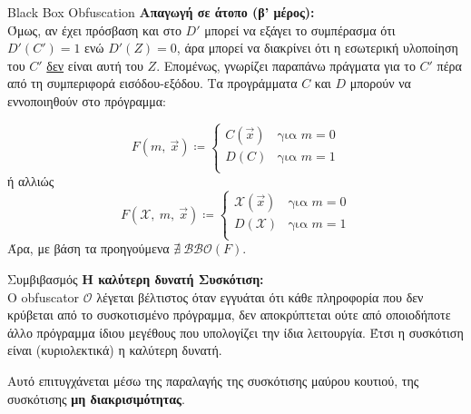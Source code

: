 \documentclass[xcolor=dvipsnames]{beamer}
\newcommand{\lt}{\latintext}
\begin{document}
\begin{frame}{\lt Black Box Obfuscation}
\textbf{Απαγωγή σε άτοπο (β' μέρος):}\\
Όμως, αν έχει πρόσβαση και στο $D'$ μπορεί να εξάγει το συμπέρασμα ότι $D'(C') = 1$ ενώ $D'(Z) = 0$, άρα μπορεί να διακρίνει ότι η εσωτερική υλοποίηση του $C'$ \underline{δεν} είναι αυτή του $Z$. Επομένως, γνωρίζει παραπάνω πράγματα για το $C'$ πέρα από τη συμπεριφορά εισόδου-εξόδου. 
Τα προγράμματα $C$ και $D$ μπορούν να εννοποιηθούν στο πρόγραμμα:

\[
	F(m,\:\vec{x}) \coloneqq \left\{
	\begin{array}{ll}
      C(\vec{x}) & \text{για } m = 0 \\
      D(C) & \text{για } m = 1\\
	\end{array} 
	\right.
\]
ή αλλιώς
\[
	F(\mathcal{X},\:m,\:\vec{x}) \coloneqq \left\{
	\begin{array}{ll}
      \mathcal{X}(\vec{x}) & \text{για } m = 0 \\
      D(\mathcal{X}) & \text{για } m = 1\\
	\end{array} 
	\right.
\]
Άρα, με βάση τα προηγούμενα $\nexists\:\mathcal{BBO}(F)$.
\end{frame}

\begin{frame}{Συμβιβασμός}
\textbf{Η καλύτερη δυνατή Συσκότιση:}\\
Ο {\lt obfuscator} $\mathcal{O}$ λέγεται βέλτιστος όταν εγγυάται ότι κάθε πληροφορία που δεν κρύβεται από το συσκοτισμένο πρόγραμμα,  δεν αποκρύπτεται ούτε από οποιοδήποτε άλλο πρόγραμμα ίδιου μεγέθους που υπολογίζει την ίδια λειτουργία. Έτσι η συσκότιση είναι (κυριολεκτικά) η καλύτερη δυνατή.

\hfill

Αυτό επιτυγχάνεται μέσω της παραλαγής της συσκότισης μαύρου κουτιού, της συσκότισης \textbf{μη διακρισιμότητας}. 

\end{frame}
\end{document}
